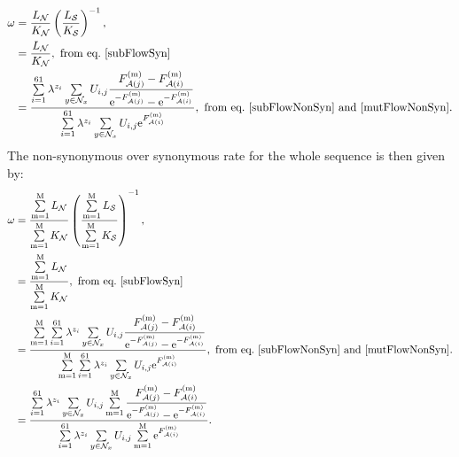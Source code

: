 \begin{align}
    \omega
    & = \dfrac{L_{\NonSyn}}{K_{\NonSyn}}  \left( \dfrac{L_{\Syn}}{K_{\Syn}}  \right)^{-1}, \\
    & = \dfrac{L_{\NonSyn}}{K_{\NonSyn}}, \ \textrm{from eq.}\ \ref{subFlowSyn} \\
    & = \dfrac{ \sum\limits_{\ci=1}^{61} \lambda^{\nbrWeak_{\ci}} \sum\limits_{y \in \NxNonSyn}  U_{\itoj} \dfrac{\Fitj\siteexp - \Fiti\siteexp}{\e^{ - \Fitj\siteexp} -  \e^{- \Fiti\siteexp} } }{ \sum\limits_{\ci=1}^{61}  \lambda^{\nbrWeak_{\ci}} \sum\limits_{y \in \NxNonSyn} U_{\itoj} \e^{\Fiti\siteexp} }, \ \textrm{from eq.}\ \ref{subFlowNonSyn} \ \text{and} \ \ref{mutFlowNonSyn}.
    \label{omegaSite}
\end{align}
The non-synonymous over synonymous rate for the whole sequence is then given by:
\begin{align}
    \omega
    & = \dfrac{\sum\limits_{\site=1}^{\Nsite} L_{\NonSyn}}{\sum\limits_{\site=1}^{\Nsite}K_{\NonSyn}}  \left( \dfrac{\sum\limits_{\site=1}^{\Nsite}L_{\Syn}}{\sum\limits_{\site=1}^{\Nsite}K_{\Syn}}  \right)^{-1}, \\
    & = \dfrac{\sum\limits_{\site=1}^{\Nsite} L_{\NonSyn}}{\sum\limits_{\site=1}^{\Nsite}K_{\NonSyn}}, \ \textrm{from eq.}\ \ref{subFlowSyn} \\
    & = \dfrac{ \sum\limits_{\site=1}^{\Nsite} \sum\limits_{\ci=1}^{61} \lambda^{\nbrWeak_{\ci}} \sum\limits_{y \in \NxNonSyn}  U_{\itoj} \dfrac{\Fitj\siteexp - \Fiti\siteexp}{\e^{ - \Fitj\siteexp} -  \e^{- \Fiti\siteexp} } }{ \sum\limits_{\site=1}^{\Nsite} \sum\limits_{\ci=1}^{61}  \lambda^{\nbrWeak_{\ci}}  \sum\limits_{y \in \NxNonSyn} U_{\itoj} \e^{\Fiti\siteexp}}, \ \textrm{from eq.}\ \ref{subFlowNonSyn} \ \text{and} \ \ref{mutFlowNonSyn}.
    \\
    & = \dfrac{ \sum\limits_{\ci=1}^{61} \lambda^{\nbrWeak_{\ci}} \sum\limits_{y \in \NxNonSyn}  U_{\itoj}  \sum\limits_{\site=1}^{\Nsite} \dfrac{\Fitj\siteexp - \Fiti\siteexp}{\e^{ - \Fitj\siteexp} -  \e^{- \Fiti\siteexp} } }{  \sum\limits_{\ci=1}^{61}  \lambda^{\nbrWeak_{\ci}}  \sum\limits_{y \in \NxNonSyn} U_{\itoj}  \sum\limits_{\site=1}^{\Nsite} \e^{\Fiti\siteexp}}.
    \label{omegaSeq}
\end{align}